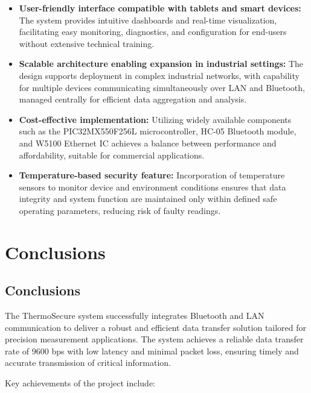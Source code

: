\documentclass[12pt]{report}
\begin{document}
\begin{itemize}[leftmargin=*]
    \item \textbf{User-friendly interface compatible with tablets and smart devices:} The system provides intuitive dashboards and real-time visualization, facilitating easy monitoring, diagnostics, and configuration for end-users without extensive technical training.
    
    \item \textbf{Scalable architecture enabling expansion in industrial settings:} The design supports deployment in complex industrial networks, with capability for multiple devices communicating simultaneously over LAN and Bluetooth, managed centrally for efficient data aggregation and analysis.
    
    \item \textbf{Cost-effective implementation:} Utilizing widely available components such as the PIC32MX550F256L microcontroller, HC-05 Bluetooth module, and W5100 Ethernet IC achieves a balance between performance and affordability, suitable for commercial applications.
    
    \item \textbf{Temperature-based security feature:} Incorporation of temperature sensors to monitor device and environment conditions ensures that data integrity and system function are maintained only within defined safe operating parameters, reducing risk of faulty readings.
    
\end{itemize}


\chapter{Conclusions}
\section{Conclusions}

The ThermoSecure system successfully integrates Bluetooth and LAN communication to deliver a robust and efficient data transfer solution tailored for precision measurement applications. The system achieves a reliable data transfer rate of 9600 bps with low latency and minimal packet loss, ensuring timely and accurate transmission of critical information.

Key achievements of the project include:
\end{document}
